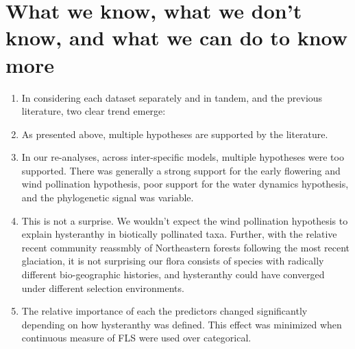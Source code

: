 \documentclass[12pt]{article}\usepackage[]{graphicx}\usepackage[]{color}
\begin{document}
\section*{What we know, what we don't know, and what we can do to know more}
\begin{enumerate}
\item In considering each dataset separately and in tandem, and the previous literature, two clear trend emerge: %
\item As presented above, multiple hypotheses are supported by the literature.
\item In our re-analyses, across inter-specific models, multiple hypotheses were too supported. There was generally a strong support for the early flowering and wind pollination hypothesis, poor support for the water dynamics hypothesis, and the phylogenetic signal was variable.
\item This is not a surprise. We wouldn't expect the wind pollination hypothesis to explain hysteranthy in biotically pollinated taxa. Further, with the relative recent community reassmbly of Northeastern forests following the most recent glaciation, it is not surprising our flora consists of species with radically different bio-geographic histories, and hysteranthy could have converged under different selection environments.
\item The relative importance of each the predictors changed significantly depending on how hysteranthy was defined. This effect was minimized when continuous measure of FLS were used over categorical.
\end{enumerate}
\end{document}
